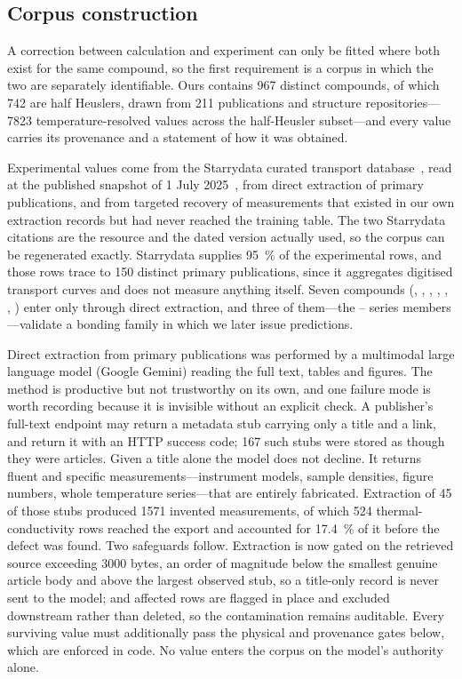 \subsection{Corpus construction}
\label{sec:dataset}
\label{sec:sources}
\label{sec:composition}

A correction between calculation and experiment can only be fitted where both exist for the same
compound, so the first requirement is a corpus in which the two are separately identifiable. Ours
contains \num{967} distinct compounds, of which \num{742} are half Heuslers, drawn from \num{211}
publications and structure repositories---\num{7823} temperature-resolved values across the
half-Heusler subset---and every value carries its provenance and a statement of how it was
obtained.

Experimental values come from the Starrydata curated transport
database~\cite{katsura2025starrydata}, read at the published snapshot of 1 July
2025~\cite{mato2025starrydata}, from direct extraction of primary publications, and from targeted
recovery of measurements that existed in our own extraction records but had never reached the
training table. The two Starrydata citations are the resource and the dated version actually used,
so the corpus can be regenerated exactly. Starrydata supplies \SI{95}{\percent} of the experimental
rows, and those rows trace to \num{150} distinct primary publications, since it aggregates
digitised transport curves and does not measure anything itself. Seven compounds
(, , , , , , ) enter
only through direct extraction, and three of them---the -- series members---validate
a bonding family in which we later issue predictions.

Direct extraction from primary publications was performed by a multimodal large language model
(Google Gemini) reading the full text, tables and figures. The method is
productive but not trustworthy on its own, and one failure mode is worth recording because it is
invisible without an explicit check. A publisher's full-text endpoint may return a metadata stub
carrying only a title and a link, and return it with an HTTP success code; \num{167} such stubs were
stored as though they were articles. Given a title alone the model does not decline. It returns
fluent and specific measurements---instrument models, sample densities, figure numbers, whole
temperature series---that are entirely fabricated. Extraction of \num{45} of those stubs produced
\num{1571} invented measurements, of which \num{524} thermal-conductivity rows reached the export
and accounted for \SI{17.4}{\percent} of it before the defect was found. Two safeguards follow.
Extraction is now gated on the retrieved source exceeding \num{3000} bytes, an order of magnitude
below the smallest genuine article body and above the largest observed stub, so a title-only record
is never sent to the model; and affected rows are flagged in place and excluded downstream rather
than deleted, so the contamination remains auditable. Every surviving value must additionally pass
the physical and provenance gates below, which are enforced in code. No
value enters the corpus on the model's authority alone.

